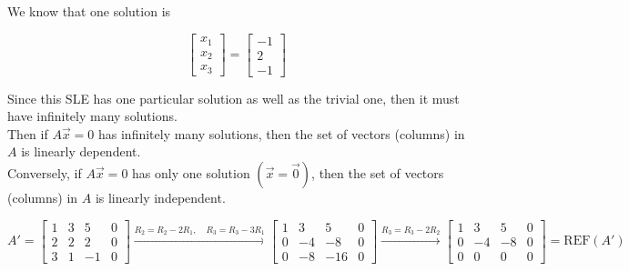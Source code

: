 \documentclass{report}
\begin{document}
We know that one solution is

\[
	\begin{bmatrix}
		x_1 \\ x_2 \\ x_3
	\end{bmatrix}
	=
	\begin{bmatrix}
		-1 \\2\\-1
	\end{bmatrix}
\]

Since this SLE has one particular solution as well as the trivial one, then it must have infinitely many solutions.\\
Then if \(A \vec{x} = 0\) has infinitely many solutions, then the set of vectors (columns) in \(A\) is linearly dependent.\\
Conversely, if \(A \vec{x} = 0\) has only one solution $(\vec{x} = \vec{0})$, then the set of vectors (columns) in \(A\) is linearly independent.\\


\[
	A' =
	\begin{bmatrix}
		1 & 3 & 5  & 0 \\
		2 & 2 & 2  & 0 \\
		3 & 1 & -1 & 0
	\end{bmatrix}
	\xrightarrow{R_2 = R_2 - 2R_1, \quad R_3 = R_3 - 3R_1}
	\begin{bmatrix}
		1 & 3  & 5   & 0 \\
		0 & -4 & -8  & 0 \\
		0 & -8 & -16 & 0
	\end{bmatrix}
	\xrightarrow{R_3 = R_3 - 2R_2}
	\begin{bmatrix}
		1 & 3  & 5  & 0 \\
		0 & -4 & -8 & 0 \\
		0 & 0  & 0  & 0
	\end{bmatrix}
	= \text{REF}(A')
\]
\end{document}
